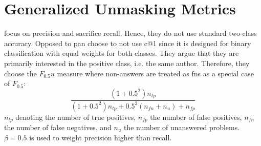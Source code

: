 \section{Generalized Unmasking Metrics}
\label{sec:generalized_unmasking_metrics}

\citet{bevendorff_generalizing_2019} focus on precision and sacrifice recall.
Hence, they do not use standard two-class accuracy.
Opposed to \ac{pan} \citet{bevendorff_generalizing_2019} choose to not use c@1 since it is designed for 
binary classification with equal weights for both classes.
They argue that they are primarily interested in the positive class, i.e. the same author.
Therefore, they choose the $F_0.5u$ measure where non-answers are treated as \acp{fn} as a special case of $F_0.5$:
$$\frac{(1+0.5^2)n_{tp}}{(1+0.5^2)n_{tp}+0.5^2(n_{fn}+n_{u})+n_{fp}}$$
$n_{tp}$ denoting the number of true positives, $n_{fp}$ the number of false positives, 
$n_{fn}$ the number of false negatives, and $n_{u}$ the number of unanswered problems.
$\beta=0.5$ is used to weight precision higher than recall.